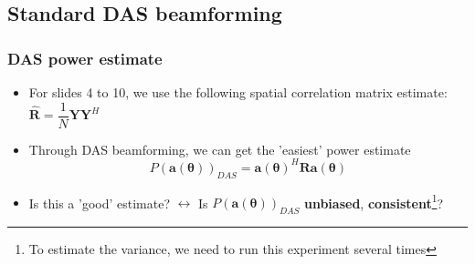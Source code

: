 \documentclass[UKenglish,8pt,aspectratio=1610]{beamer}
\begin{document}
	\subsection{Standard DAS beamforming}
	\begin{frame}
		\frametitle{DAS power estimate \cite{twoDecades,uncini,Johnson1993ArraySP}}
		\begin{itemize}
			\item For slides 4 to 10, we use the following spatial correlation matrix estimate: $\boldsymbol{\hat{\mathbf{R}}}=\dfrac{1}{N}\mathbf{Y}\mathbf{Y}^H$
			\item Through DAS beamforming, we can get the 'easiest' power estimate
	\begin{equation}
		P(\mathbf{a(\theta)})_{DAS}=\mathbf{a(\theta)}^H\mathbf{R}\mathbf{a(\theta)}
	\end{equation}
\item Is this a 'good' estimate? $\longleftrightarrow$ Is $P(\mathbf{a(\theta)})_{DAS}$ \textbf{unbiased}, \textbf{consistent}\footnote{To estimate the variance, we need to run this experiment several times}?
		\end{itemize}
	

\end{frame}
\end{document}
